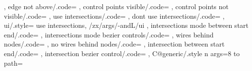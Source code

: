 {{{      \def\zxEdgesAbove{}%
    },%
    edge not above/.code={%
      \let\zxEdgesAbove\undefined%
    },
    control points visible/.code={%
      \def\zxControlPointsVisible{}%
    },%
    control points not visible/.code={%
      \let\zxControlPointsVisible\undefined%
    },
    use intersections/.code={%
      \def\zxEnableIntersectionsWires{}%
    },
    dont use intersections/.code={%
      \let\zxEnableIntersectionsWires\undefined%
    },
    ui/.style={
      use intersections,
      /zx/args/-andL/ui
    },
    intersections mode between start end/.code={%
      \def\zxIntersectionLineBetweenStartEnd{}%
    },
    intersections mode bezier controls/.code={%
      \let\zxIntersectionLineBetweenStartEnd\undefined%
    },
    wires behind nodes/.code={%
      \def\zxWireInsideIfNoIntersectionName{}%
    },
    no wires behind nodes/.code={%
      \let\zxWireInsideIfNoIntersectionName\undefined%
    },
    intersection between start end/.code={
      \def\zxIntersectionLineBetweenStartEnd{}%
    },
    intersection bezier control/.code={
      \let\zxIntersectionLineBetweenStartEnd\undefined%
    },
    C@generic/.style n args={8}{ %
      to path={
        \pgfextra{%
          \ifPgfpointOrNode{\tikztostart}{%
            \def\StartPoint{\tikztostart}%
}}}}}}
